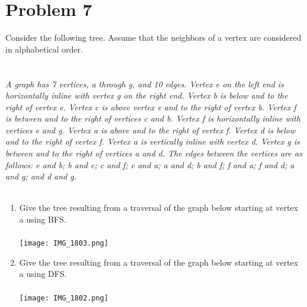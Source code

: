\documentclass{amsart}
\theoremstyle{definition}
\theoremstyle{Exercise}
\theoremstyle{remark}
\theoremstyle{rule}
\numberwithin{equation}{section}
\begin{document}
\section*{Problem 7}
Consider the following tree. Assume that the neighbors of a vertex are considered in alphabetical order.
\\
\\\\
{\color{blue}{\bf Figure 15:} \emph{A graph has 7 vertices, a through g, and 10 edges. Vertex e on the left end is horizontally inline with vertex g on the right end. Vertex b is below and to the right of vertex e. Vertex c is above vertex e and to the right of vertex b. Vertex f is between and to the right of vertices c and b. Vertex f is horizontally inline with vertices e and g. Vertex a is above and to the right of vertex f. Vertex d is below and to the right of vertex f. Vertex a is vertically inline with vertex d. Vertex g is between and to the right of vertices a and d. The edges between the vertices are as follows: e and b; b and c; c and f; c and a; a and d; b and f; f and a; f and d; a and g; and d and g.
}
}
\\
\\
\begin{enumerate}[label=(\alph*)]
    \item Give the tree resulting from a traversal of the graph below starting at vertex a using BFS. \\\\
\texttt{[image: IMG\_1803.png]}\\

    \item Give the tree resulting from a traversal of the graph below starting at vertex a using DFS.\\\\
\texttt{[image: IMG\_1802.png]}
\end{enumerate}
\newpage
\end{document}
